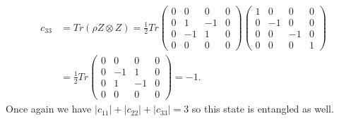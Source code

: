 \documentclass[10pt]{article}
\begin{document}
\begin{align*}
c_{33} &= Tr (\rho Z \otimes Z) = \frac{1}{2} Tr 
\begin{pmatrix}
        0 & 0   & 0   & 0 \\
        0 & 1   & -1 & 0 \\
        0 & -1 & 1   & 0 \\
        0 & 0   & 0   & 0 
\end{pmatrix}
\begin{pmatrix}
1 & 0 & 0 & 0 \\
0 & -1 & 0 & 0 \\
0 & 0 & -1 & 0 \\
0 & 0 & 0 & 1 
\end{pmatrix} \\
&= \frac{1}{2} Tr 
\begin{pmatrix}
0 & 0 & 0 & 0 \\
0 & -1 & 1 & 0 \\
0 & 1 & -1 & 0 \\
0 & 0 & 0 & 0 
\end{pmatrix} = -1.
\end{align*}
Once again we have $|c_{11}| + |c_{22}| + |c_{33}| = 3$ so this state is entangled as well.
\end{document}

